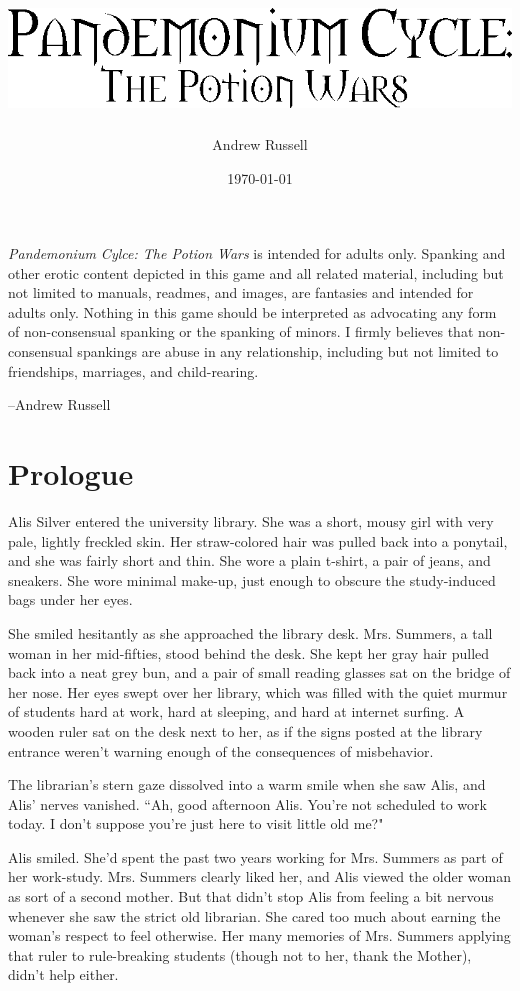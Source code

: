 \documentclass{report}
\title{\includegraphics{title}}
\author{Andrew Russell}
\date{\today}
\begin{document}
\textit{Pandemonium Cylce: The Potion Wars} is intended for adults only. Spanking and other erotic content depicted in this game and all related material,
including but not limited to manuals, readmes, and images, are fantasies and intended for adults only. Nothing in this game should be interpreted as advocating any
form of non-consensual spanking or the spanking of minors. I firmly believes that non-consensual spankings are abuse in any relationship, including but not
limited to friendships, marriages, and child-rearing.

--Andrew Russell

\chapter*{Prologue}
\label{ch_prologue}
Alis Silver entered the university library. She was a short, mousy girl with very pale, lightly freckled skin. Her straw-colored hair was pulled back
into a ponytail, and she was fairly
short and thin. She wore a plain t-shirt, a pair of jeans, and sneakers. She wore minimal make-up, just enough to obscure the study-induced bags under her eyes. 

She 
smiled hesitantly as she approached the library desk. Mrs. Summers, a tall woman in her mid-fifties, stood behind the desk. She kept her gray hair pulled 
back into a neat grey bun, and a pair of small reading glasses sat on the bridge of her nose. Her eyes swept over her library, which was filled with the quiet murmur of 
students
hard at work, hard at sleeping, and hard at internet surfing. A wooden ruler sat on the desk next to her, as if the signs posted at the library entrance weren't warning
enough of the consequences of misbehavior.

The librarian's stern gaze dissolved into a warm smile when she saw Alis, and Alis' nerves vanished. ``Ah, good afternoon Alis. You're not scheduled to work
today. I don't suppose you're just here to visit little old me?"

Alis smiled. She'd spent the past two years working for Mrs. Summers as part of her work-study. Mrs. Summers clearly liked her, and Alis viewed the older woman as sort of a 
second mother. But that didn't stop Alis from feeling a bit nervous whenever she saw the strict old librarian. She cared too much about earning the woman's respect to feel 
otherwise. Her many memories of Mrs. Summers applying that ruler to rule-breaking students (though not to her, thank the Mother), didn't help either.
\end{document}
